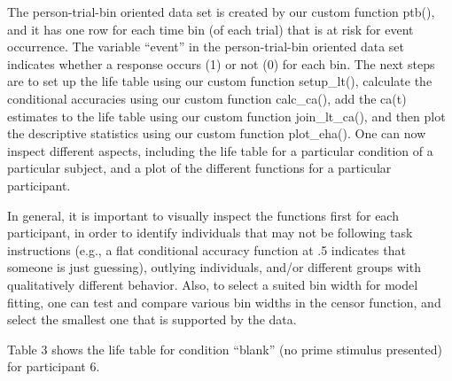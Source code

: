 \documentclass[
  man, donotrepeattitle,floatsintext]{apa6}
\begin{document}
The person-trial-bin oriented data set is created by our custom function ptb(), and it has one row for each time bin (of each trial) that is at risk for event occurrence. The variable ``event'' in the person-trial-bin oriented data set indicates whether a response occurs (1) or not (0) for each bin. The next steps are to set up the life table using our custom function setup\_lt(), calculate the conditional accuracies using our custom function calc\_ca(), add the ca(t) estimates to the life table using our custom function join\_lt\_ca(), and then plot the descriptive statistics using our custom function plot\_eha().
One can now inspect different aspects, including the life table for a particular condition of a particular subject, and a plot of the different functions for a particular participant.

In general, it is important to visually inspect the functions first for each participant, in order to identify individuals that may not be following task instructions (e.g., a flat conditional accuracy function at .5 indicates that someone is just guessing), outlying individuals, and/or different groups with qualitatively different behavior. Also, to select a suited bin width for model fitting, one can test and compare various bin widths in the censor function, and select the smallest one that is supported by the data.

Table 3 shows the life table for condition ``blank'' (no prime stimulus presented) for participant 6.
\end{document}
